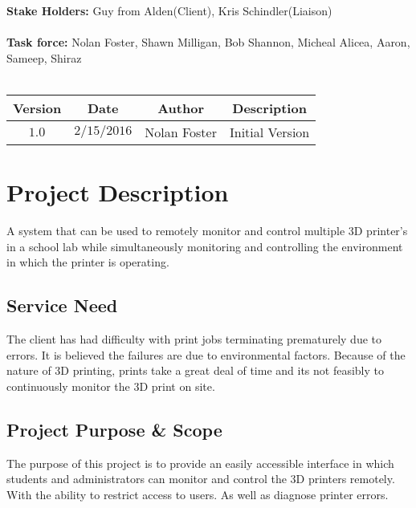 

\rfoot{\thepage}%


  \tableofcontents\newpage
  \noindent\textbf{Stake Holders:} Guy from Alden(Client), Kris Schindler(Liaison)\\\\

  \noindent\textbf{Task force:} Nolan Foster, Shawn Milligan, Bob Shannon, Micheal Alicea, Aaron, Sameep, Shiraz\\\\

  \begin{center}
  \begin{tabular}{|c|c|c|c|}
    \hline
    \textbf{Version} & \textbf{Date} & \textbf{Author} & \textbf{Description}\\
    \hline
    $1.0$ & $2/15/2016$ & Nolan Foster & Initial Version\\
    \hline
  \end{tabular}

  \end{center}
  \newpage

  \section{Project Description}
  A system that can be used to remotely monitor and control multiple 3D printer's
  in a school lab while simultaneously monitoring and controlling the environment
  in which the printer is operating.

  \subsection{Service Need}
  The client has had difficulty with print jobs terminating prematurely due to errors.
  It is believed the failures are due to environmental factors. Because of the nature
  of 3D printing, prints take a great deal of time and its not feasibly to continuously
  monitor the 3D print on site.

  \subsection{Project Purpose \& Scope}
  The purpose of this project is to provide an easily accessible interface in which
  students and administrators can monitor and control the 3D printers remotely. With
  the ability to restrict access to users. As well as diagnose printer errors.

